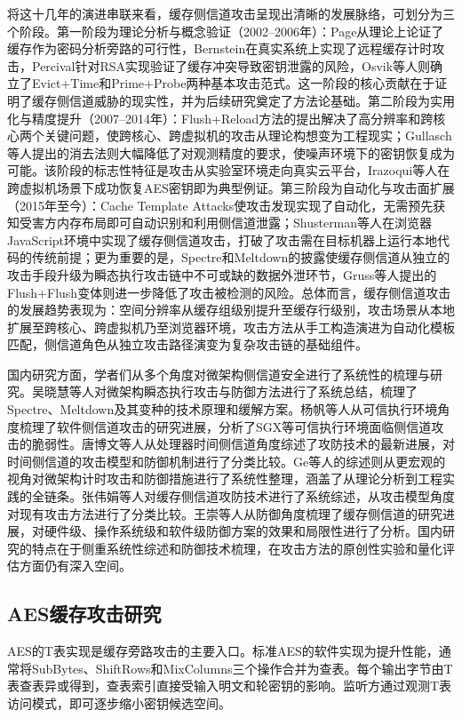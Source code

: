 将这十几年的演进串联来看，缓存侧信道攻击呈现出清晰的发展脉络，可划分为三个阶段。第一阶段为理论分析与概念验证（2002--2006年）：Page从理论上论证了缓存作为密码分析旁路的可行性，Bernstein在真实系统上实现了远程缓存计时攻击，Percival针对RSA实现验证了缓存冲突导致密钥泄露的风险，Osvik等人则确立了Evict+Time和Prime+Probe两种基本攻击范式。这一阶段的核心贡献在于证明了缓存侧信道威胁的现实性，并为后续研究奠定了方法论基础。第二阶段为实用化与精度提升（2007--2014年）：Flush+Reload方法的提出解决了高分辨率和跨核心两个关键问题，使跨核心、跨虚拟机的攻击从理论构想变为工程现实；Gullasch等人提出的消去法则大幅降低了对观测精度的要求，使噪声环境下的密钥恢复成为可能。该阶段的标志性特征是攻击从实验室环境走向真实云平台，Irazoqui等人在跨虚拟机场景下成功恢复AES密钥即为典型例证。第三阶段为自动化与攻击面扩展（2015年至今）：Cache Template Attacks使攻击发现实现了自动化，无需预先获知受害方内存布局即可自动识别和利用侧信道泄露；Shusterman等人在浏览器JavaScript环境中实现了缓存侧信道攻击，打破了攻击需在目标机器上运行本地代码的传统前提；更为重要的是，Spectre和Meltdown的披露使缓存侧信道从独立的攻击手段升级为瞬态执行攻击链中不可或缺的数据外泄环节，Gruss等人提出的Flush+Flush变体则进一步降低了攻击被检测的风险。总体而言，缓存侧信道攻击的发展趋势表现为：空间分辨率从缓存组级别提升至缓存行级别，攻击场景从本地扩展至跨核心、跨虚拟机乃至浏览器环境，攻击方法从手工构造演进为自动化模板匹配，侧信道角色从独立攻击路径演变为复杂攻击链的基础组件。

国内研究方面，学者们从多个角度对微架构侧信道安全进行了系统性的梳理与研究。吴晓慧等人对微架构瞬态执行攻击与防御方法进行了系统总结\cite{WuXH2020}，梳理了Spectre、Meltdown及其变种的技术原理和缓解方案。杨帆等人从可信执行环境角度梳理了软件侧信道攻击的研究进展\cite{YangF2023}，分析了SGX等可信执行环境面临侧信道攻击的脆弱性。唐博文等人从处理器时间侧信道角度综述了攻防技术的最新进展\cite{TangBW2024}，对时间侧信道的攻击模型和防御机制进行了分类比较。Ge等人的综述\cite{Ge2018}则从更宏观的视角对微架构计时攻击和防御措施进行了系统性整理，涵盖了从理论分析到工程实践的全链条。张伟娟等人对缓存侧信道攻防技术进行了系统综述，从攻击模型角度对现有攻击方法进行了分类比较。王崇等人从防御角度梳理了缓存侧信道的研究进展，对硬件级、操作系统级和软件级防御方案的效果和局限性进行了分析。国内研究的特点在于侧重系统性综述和防御技术梳理，在攻击方法的原创性实验和量化评估方面仍有深入空间。

\subsection{AES缓存攻击研究}

AES的T表实现是缓存旁路攻击的主要入口。标准AES的软件实现为提升性能，通常将SubBytes、ShiftRows和MixColumns三个操作合并为查表。每个输出字节由T表查表异或得到，查表索引直接受输入明文和轮密钥的影响。监听方通过观测T表访问模式，即可逐步缩小密钥候选空间。

